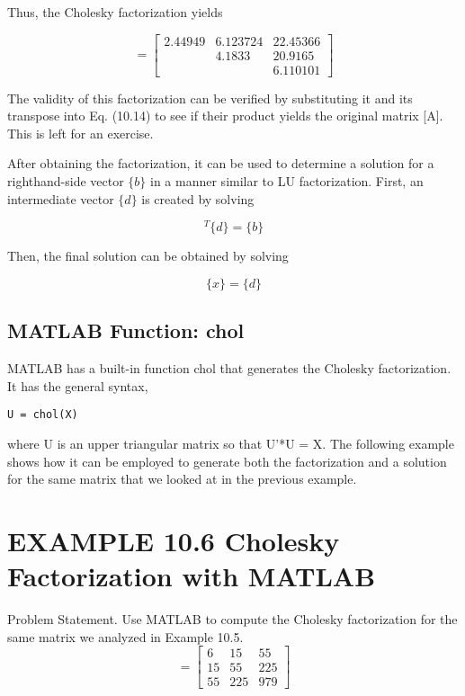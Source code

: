 \documentclass[../main.tex]{subfiles}
\begin{document}
Thus, the Cholesky factorization yields

\begin{equation}
[U] =
\begin{bmatrix}
2.44949& 6.123724& 22.45366\\
&4.1833&20.9165\\
&&6.110101
\end{bmatrix}
\end{equation}

The validity of this factorization can be verified by substituting it and its transpose
into Eq. (10.14) to see if their product yields the original matrix [A]. This is left for an exercise.

After obtaining the factorization, it can be used to determine a solution for a righthand-side vector $\{b\}$ in a manner similar to LU factorization. First, an intermediate vector $\{d\}$ is created by solving

\begin{equation}
[U]^{T}\{d\}=\{b\} 
\tag{10.17}
\end{equation}

Then, the final solution can be obtained by solving

\begin{equation}
[U]\{x\}=\{d\} 
\tag{10.17}
\end{equation}

\subsection{MATLAB Function: chol}

MATLAB has a built-in function chol that generates the Cholesky factorization. It has the
general syntax,

\begin{lstlisting}[numbers=none]
U = chol(X)
\end{lstlisting}

where U is an upper triangular matrix so that U'*U = X. The following example shows how
it can be employed to generate both the factorization and a solution for the same matrix that we looked at in the previous example.

\section*{EXAMPLE 10.6 Cholesky Factorization with MATLAB}

Problem Statement. Use MATLAB to compute the Cholesky factorization for the same
matrix we analyzed in Example 10.5.
\begin{equation}
[A] =
\begin{bmatrix}
6& 15& 55\\
15& 55& 225\\
55& 225& 979
\end{bmatrix}
\end{equation}
\end{document}
